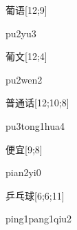 \begin{verbete}[pu2yu3]{葡语}[12;9]
\begin{pronuncia}{pu2yu3}
\end{pronuncia}
\end{verbete}

\begin{verbete}[pu2wen2]{葡文}[12;4]
\begin{pronuncia}{pu2wen2}
\end{pronuncia}
\end{verbete}

\begin{verbete}{普通话}[12;10;8]
\begin{pronuncia}{pu3tong1hua4}
\end{pronuncia}
\end{verbete}

\begin{verbete}[pian2yi0]{便宜}[9;8]
\begin{pronuncia}{pian2yi0}
\end{pronuncia}
\end{verbete}

\begin{verbete}{乒乓球}[6;6;11]
\begin{pronuncia}[\\]{ping1pang1qiu2}
\end{pronuncia}
\end{verbete}

